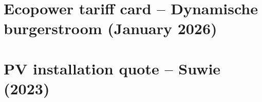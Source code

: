 \documentclass[11pt,a4paper]{report}
\begin{document}


\chapter{Ecopower tariff card -- Dynamische burgerstroom (January 2026)}
\label{appendix:tariefkaart}



\chapter{PV installation quote -- Suwie (2023)}
\label{appendix:suwie_quote}





\end{document}
